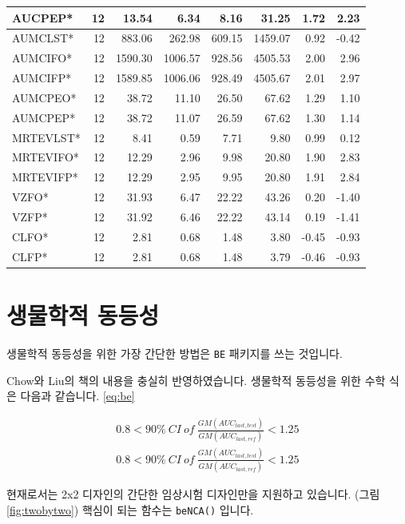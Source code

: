 \documentclass[
  10pt,
]{krantz}
\begin{document}
\begin{tabular}{l|r|r|r|r|r|r|r}
\hline
AUCPEP* & 12 & 13.54 & 6.34 & 8.16 & 31.25 & 1.72 & 2.23\\
\hline
AUMCLST* & 12 & 883.06 & 262.98 & 609.15 & 1459.07 & 0.92 & -0.42\\
\hline
AUMCIFO* & 12 & 1590.30 & 1006.57 & 928.56 & 4505.53 & 2.00 & 2.96\\
\hline
AUMCIFP* & 12 & 1589.85 & 1006.06 & 928.49 & 4505.67 & 2.01 & 2.97\\
\hline
AUMCPEO* & 12 & 38.72 & 11.10 & 26.50 & 67.62 & 1.29 & 1.10\\
\hline
AUMCPEP* & 12 & 38.72 & 11.07 & 26.59 & 67.62 & 1.30 & 1.14\\
\hline
MRTEVLST* & 12 & 8.41 & 0.59 & 7.71 & 9.80 & 0.99 & 0.12\\
\hline
MRTEVIFO* & 12 & 12.29 & 2.96 & 9.98 & 20.80 & 1.90 & 2.83\\
\hline
MRTEVIFP* & 12 & 12.29 & 2.95 & 9.95 & 20.80 & 1.91 & 2.84\\
\hline
VZFO* & 12 & 31.93 & 6.47 & 22.22 & 43.26 & 0.20 & -1.40\\
\hline
VZFP* & 12 & 31.92 & 6.46 & 22.22 & 43.14 & 0.19 & -1.41\\
\hline
CLFO* & 12 & 2.81 & 0.68 & 1.48 & 3.80 & -0.45 & -0.93\\
\hline
CLFP* & 12 & 2.81 & 0.68 & 1.48 & 3.79 & -0.46 & -0.93\\
\hline
\end{tabular}

\hypertarget{bioequivalence}{%
\section{생물학적 동등성}\label{bioequivalence}}

생물학적 동등성을 위한 가장 간단한 방법은 \texttt{BE} 패키지\citep{R-BE}를 쓰는 것입니다.

Chow와 Liu의 책의 내용을 충실히 반영하였습니다. \citep{chow2009design}
생물학적 동등성을 위한 수학 식은 다음과 같습니다. \eqref{eq:be}

\begin{equation}
\begin{split}
  0.8 < 90\%\ CI\ of\ \frac{GM(AUC_{last, test})}{GM(AUC_{last, ref})} < 1.25 \\
  0.8 < 90\%\ CI\ of\ \frac{GM(AUC_{last, test})}{GM(AUC_{last, ref})} < 1.25 
\label{eq:be}
\end{split}
\end{equation}

현재로서는 2x2 디자인의 간단한 임상시험 디자인만을 지원하고 있습니다. (그림 \ref{fig:twobytwo})
핵심이 되는 함수는 \texttt{beNCA()} 입니다.
\end{document}

